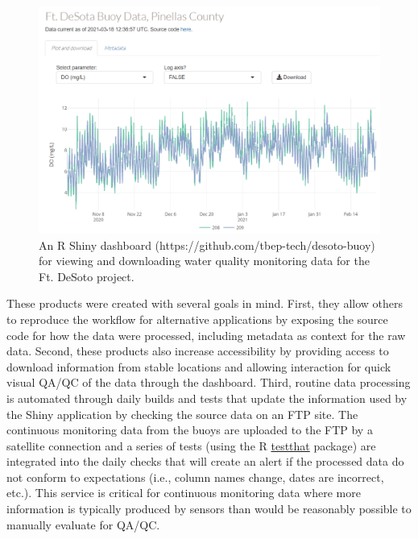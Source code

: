 \documentclass[
]{book}
\begin{document}
\begin{figure}

{\centering \includegraphics[width=1\linewidth]{img/desotoshiny} 

}

\caption{An R Shiny dashboard (https://github.com/tbep-tech/desoto-buoy) for viewing and downloading water quality monitoring data for the Ft. DeSoto project.}\label{fig:desotoshiny}
\end{figure}

These products were created with several goals in mind. First, they allow others to reproduce the workflow for alternative applications by exposing the source code for how the data were processed, including metadata as context for the raw data. Second, these products also increase accessibility by providing access to download information from stable locations and allowing interaction for quick visual QA/QC of the data through the dashboard. Third, routine data processing is automated through daily builds and tests that update the information used by the Shiny application by checking the source data on an FTP site. The continuous monitoring data from the buoys are uploaded to the FTP by a satellite connection and a series of tests (using the R \href{https://testthat.r-lib.org/}{testthat} package) are integrated into the daily checks that will create an alert if the processed data do not conform to expectations (i.e., column names change, dates are incorrect, etc.). This service is critical for continuous monitoring data where more information is typically produced by sensors than would be reasonably possible to manually evaluate for QA/QC.
\end{document}

